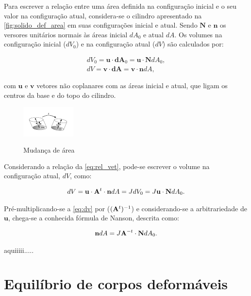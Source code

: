 Para escrever a relação entre uma área definida na configuração inicial e o seu valor na configuração atual, considera-se o cilindro apresentado na \autoref{fig:solido_def_area} em suas configurações inicial e atual. Sendo $\mathbf{N}$ e $\mathbf{n}$ os versores unitários normais às áreas inicial $dA_{0}$ e atual $dA$. Os volumes na configuração inicial ($dV_{0}$) e na configuração atual ($dV$) são calculados por:

\begin{align}
dV_{0} = \mathbf{u} \cdot \mathbf{dA}_{0} = \mathbf{u} \cdot \mathbf{N} dA_0 ,\\
dV = \mathbf{v} \cdot \mathbf{dA} = \mathbf{v} \cdot \mathbf{n} dA \label{eq:vol_func_area},
\end{align}

\noindent com $\mathbf{u}$ e $\mathbf{v}$ vetores não coplanares com as áreas inicial e atual, que ligam os centros da base e do topo do cilindro.

\begin{figure}[!htbp]
	\caption{Mudança de área}
	\centering
	\includegraphics[scale=6.0,trim=0cm 0.2cm 0cm 0cm, clip=true]{Imagens/Cap4/sol_def_area.pdf}	
	\label{fig:solido_def_area}
\end{figure}

Considerando a relação da \autoref{eq:rel_vet}, pode-se escrever o volume na configuração atual, $dV$, como:

\begin{align}
	dV = \mathbf{u} \cdot \mathbf{A}^{t} \cdot \mathbf{n} dA = J dV_0 = J \mathbf{u} \cdot \mathbf{N} dA_0. \label{eq:dv}
\end{align}

Pré-multiplicando-se a \autoref{eq:dv} por ($(\mathbf{A}^{t})^{-1}$) e considerando-se a arbitrariedade de $\mathbf{u}$, chega-se a conhecida fórmula de Nanson, descrita como:

\begin{align}
\mathbf{n}dA = J \mathbf{A}^{-t} \cdot \mathbf{N} dA_{0}. \label{eq:Nanson}
\end{align}

aquiiiii.....

\section{Equilíbrio de corpos deformáveis} \label{capitulo:Cap3:EquilibrioCorposDeformaveis}

